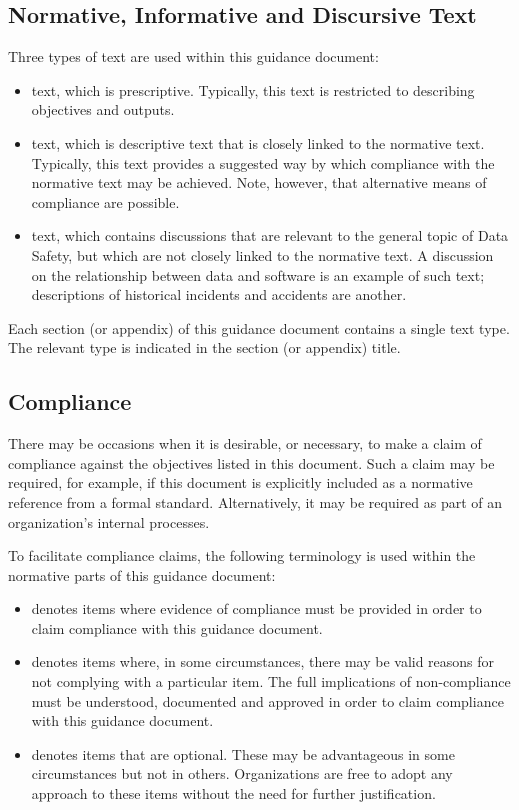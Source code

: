 \subsection{Normative, Informative and Discursive Text}
Three types of text are used within this guidance document:
\begin{itemize}
	\item {} text, which is prescriptive. Typically, this text is restricted to describing objectives and outputs.
	\item {} text, which is descriptive text that is closely linked to the normative text. Typically, this text provides a suggested way by which compliance with the normative text may be achieved. Note, however, that alternative means of compliance are possible.
	\item {} text, which contains discussions that are relevant to the general topic of Data Safety, but which are not closely linked to the normative text. A discussion on the relationship between data and software is an example of such text; descriptions of historical incidents and accidents are another.
\end{itemize}

Each section (or appendix) of this guidance document contains a single text type. The relevant type is indicated in the section (or appendix) title.

\subsection{Compliance}
There may be occasions when it is desirable, or necessary, to make a claim of compliance against the objectives listed in this document. Such a claim may be required, for example, if this document is explicitly included as a normative reference from a formal standard. Alternatively, it may be required as part of an organization's internal processes.

To facilitate compliance claims, the following terminology is used within the normative parts of this guidance document:
\begin{itemize}
	\item {} denotes items where evidence of compliance must be provided in order to claim compliance with this guidance document.
	\item {} denotes items where, in some circumstances, there may be valid reasons for not complying with a particular item. The full implications of non-compliance must be understood, documented and approved in order to claim compliance with this guidance document.
	\item {} denotes items that are optional. These may be advantageous in some circumstances but not in others. Organizations are free to adopt any approach to these items without the need for further justification.
\end{itemize}
